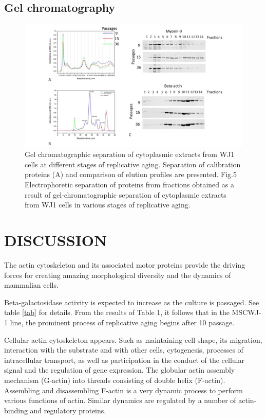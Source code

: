 \documentclass[english,authoryear]{elsarticle}
\begin{document}
\subsection{Gel chromatography}

\begin{figure}[hbt!]
\centering
\includegraphics[width=0.9\linewidth]{fig_fplc.jpg}
\caption{Gel chromatographic separation of cytoplasmic extracts from WJ1 cells at different stages of replicative aging. Separation of calibration proteins (A) and comparison of elution profiles are presented. Fig.5 Electrophoretic separation of proteins from fractions obtained as a result of gel-chromatographic separation of cytoplasmic extracts from WJ1 cells in various stages of replicative aging.}
\label{fpcl}
\end{figure}


\section{DISCUSSION}


The actin cytoskeleton and its associated motor proteins provide the driving forces for creating amazing morphological diversity and the dynamics of mammalian cells.

Beta-galactosidase activity is expected to increase as the culture is passaged.
See table \ref{tab} for details.
From the results of Table 1, it follows that in the MSCWJ-1 line, the prominent process of replicative aging begins after 10 passage.

Cellular actin cytoskeleton appears.
Such as maintaining cell shape, its migration, interaction with the substrate and with other cells, cytogenesis, processes of intracellular transport, as well as participation in the conduct of the cellular signal and the regulation of gene expression.
The globular actin assembly mechanism (G-actin) into threads consisting of double helix (F-actin).
Assembling and disassembling F-actin is a very dynamic process to perform various functions of actin. Similar dynamics are regulated by a number of actin-binding and regulatory proteins.
\end{document}
